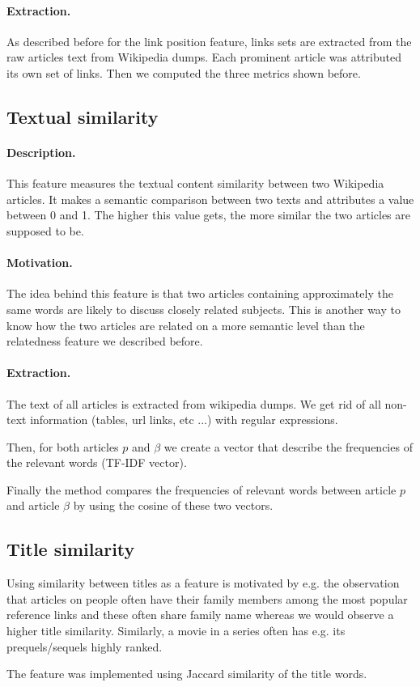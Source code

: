 \paragraph{Extraction.}
As described before for the link position feature, links sets are extracted from the raw articles text from Wikipedia dumps. Each prominent article was attributed its own set of links. Then we computed the three metrics shown before. 

\subsection{Textual similarity}
\label{textual similarity}
\paragraph{Description.}
This feature measures the textual content similarity between two Wikipedia articles. It makes a semantic comparison between two texts and attributes a value between 0 and 1. The higher this value gets, the more similar the two articles are supposed to be.



\paragraph{Motivation.}
The idea behind this feature is that two articles containing approximately the same words are likely to discuss closely related subjects. This is another way to know how the two articles are related on a more semantic level than the relatedness feature we described before.

\paragraph{Extraction.}
The text of all articles is extracted from wikipedia dumps. We get rid of all non-text information (tables, url links, etc ...) with regular expressions.

Then, for both articles $p$ and $\beta$ we create a vector that describe the frequencies of the relevant words (TF-IDF vector).

Finally the method compares the frequencies of relevant words between article $p$ and article $\beta$ by using the cosine of these two vectors.

\subsection{Title similarity}
\label{title similarity}
Using similarity between titles as a feature is motivated by e.g. the observation that articles on people often have their family members among the most popular reference links and these often share family name whereas we would observe a higher title similarity. Similarly, a movie in a series often has e.g. its prequels/sequels highly ranked.

The feature was implemented using Jaccard similarity of the title words. %

